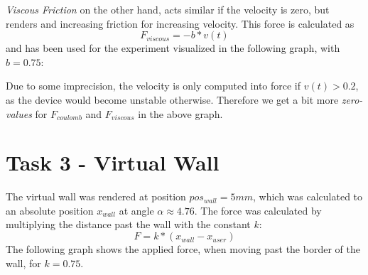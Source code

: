   \begin{figure}[H]
    \centering
  \end{figure}

  \textit{Viscous Friction} on the other hand, acts similar if the velocity is zero, but renders and increasing friction for increasing velocity. This force is calculated as
  \begin{equation*}
    F_{viscous} = -b * v(t)
  \end{equation*}
  and has been used for the experiment visualized in the following graph, with $b = 0.75$:

  \begin{figure}[H]
    \centering
  \end{figure}

  Due to some imprecision, the velocity is only computed into force if $v(t) > 0.2$, as the device would become unstable otherwise. Therefore we get a bit more \textit{zero-values} for $F_{coulomb}$ and $F_{viscous}$ in the above graph.

  \section*{Task 3 - Virtual Wall}

  The virtual wall was rendered at position $pos_{wall} = 5mm$, which was calculated to an absolute position $x_{wall}$ at angle $\alpha \approx 4.76$. The force was calculated by multiplying the distance past the wall with the constant $k$:
  \begin{equation*}
    F = k * (x_{wall} - x_{user})
  \end{equation*}
  The following graph shows the applied force, when moving past the border of the wall, for $k = 0.75$.

